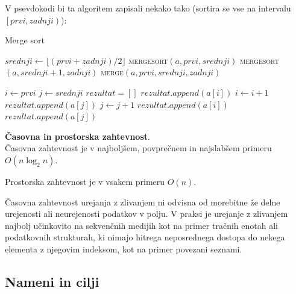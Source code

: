 \documentclass[a4paper,oneside]{article}
\begin{document}
V psevdokodi bi ta algoritem zapisali nekako tako (sortira se vse na intervalu
$\left[prvi, zadnji\right)$):

\begin{algorithm}
  \caption{Merge sort}\label{algo:mergesort}
  \begin{algorithmic}[1]
         \Return \EndIf
        \State $srednji \gets \lfloor(prvi + zadnji) / 2\rfloor$
        \textsc{mergesort}$(a, prvi, srednji)$
        \textsc{mergesort}$(a, srednji + 1, zadnji)$
        \textsc{merge}$(a, prvi, srednji, zadnji)$
    \EndFunction
  \end{algorithmic}
  
  \begin{algorithmic}[1]
        \State $i \gets prvi$
        \State $j \gets srednji$
        \State $rezultat = []$ 
                \State $rezultat.append(a[i])$ 
                \State $i \gets i + 1$
            \Else
                \State $rezultat.append(a[j])$ 
                \State $j \gets j + 1$
            \EndIf
        \EndWhile
            \State $rezultat.append(a[i])$ 
        \EndWhile
            \State $rezultat.append(a[j])$ 
        \EndWhile
    \EndFunction
  \end{algorithmic}
\end{algorithm}

\textbf{Časovna in prostorska zahtevnost}. \\
Časovna zahtevnost je v najboljšem, povprečnem in najslabšem primeru $O(n\log_2 n)$.

Prostorska zahtevnost je v vsakem primeru $O(n)$. %

Časovna zahtevnost urejanja z zlivanjem ni odvisna od morebitne že delne urejenosti ali
neurejenosti podatkov v polju. V praksi je urejanje z zlivanjem najbolj učinkovito na
sekvenčnih medijih kot na primer tračnih enotah ali podatkovnih strukturah, ki nimajo hitrega
neposrednega dostopa do nekega elementa z njegovim indeksom, kot na primer povezani seznami.


\subsection{Nameni in cilji}
\end{document}
